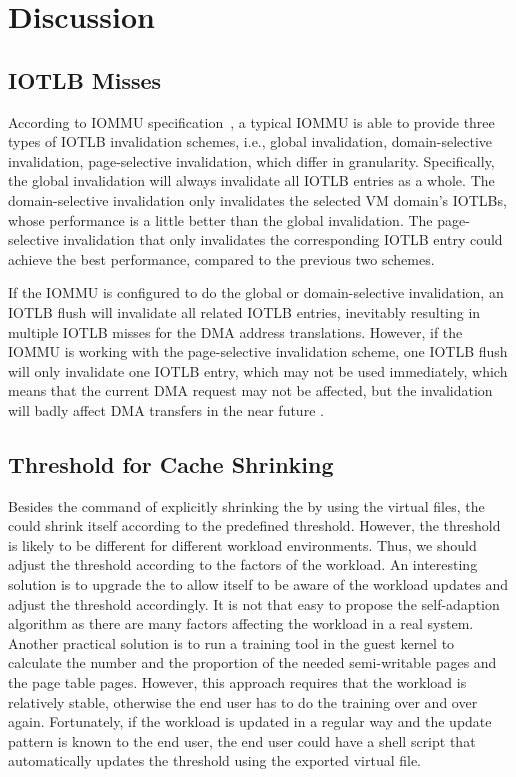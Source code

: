 \section{Discussion}\label{sec:dis}

\subsection{IOTLB Misses}
According to IOMMU specification~\cite{intelvt, amdvt}, a typical IOMMU is able to provide three types of IOTLB invalidation schemes, i.e., global invalidation, domain-selective invalidation, page-selective invalidation, which differ in granularity.
Specifically, the global invalidation will always invalidate all IOTLB entries as a whole.
The domain-selective invalidation only invalidates the selected VM domain's IOTLBs, whose performance is a little better than the global invalidation.
The page-selective invalidation that only invalidates the corresponding IOTLB entry could achieve the best performance, compared to the previous two schemes.

If the IOMMU is configured to do the global or domain-selective invalidation, an IOTLB flush will invalidate all related IOTLB entries, inevitably resulting in multiple IOTLB misses for the DMA address translations. However, if the IOMMU is working with the page-selective invalidation scheme, one IOTLB flush will only invalidate one IOTLB entry, which may not be used immediately, which means that the current DMA request may not be affected, but the invalidation will badly affect DMA transfers in the near future .

\subsection{Threshold for \name Cache Shrinking}
Besides the command of explicitly shrinking the \cache by using the virtual files, the \cache could shrink itself according to the predefined threshold.
However, the threshold is likely to be different for different workload environments.
Thus, we should adjust the threshold according to the factors of the workload.
An interesting solution is to upgrade the \cache to allow itself to be aware of the workload updates and adjust the threshold accordingly.
It is not that easy to propose the self-adaption algorithm as there are many factors affecting the workload in a real system.
Another practical solution is to run a training tool in the guest kernel to calculate the number and the proportion of the needed semi-writable pages and the page table pages.
However, this approach requires that the workload is relatively stable, otherwise the end user has to do the training over and over again.
Fortunately, if the workload is updated in a regular way and the update pattern is known to the end user, the end user could have a shell script that automatically updates the threshold using the exported virtual file.

